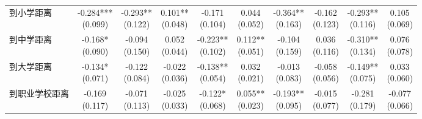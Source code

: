 \documentclass[a4paper,12pt]{report}
\begin{document}
\begin{table}[H]
{\begin{tabular}{lccccccccc}
到小学距离 & \makecell{-0.284***\\(0.099)} & \makecell{-0.293**\\(0.122)} & \makecell{0.101**\\(0.048)} & \makecell{-0.171\\(0.104)} & \makecell{0.044\\(0.052)} & \makecell{-0.364**\\(0.163)} & \makecell{-0.162\\(0.123)} & \makecell{-0.293**\\(0.116)} & \makecell{0.105\\(0.069)} \\
到中学距离 & \makecell{-0.168*\\(0.090)} & \makecell{-0.094\\(0.150)} & \makecell{0.052\\(0.044)} & \makecell{-0.223**\\(0.102)} & \makecell{0.112**\\(0.051)} & \makecell{-0.104\\(0.159)} & \makecell{0.036\\(0.116)} & \makecell{-0.310**\\(0.134)} & \makecell{0.076\\(0.078)} \\
到大学距离 & \makecell{-0.134*\\(0.071)} & \makecell{-0.122\\(0.084)} & \makecell{-0.022\\(0.036)} & \makecell{-0.138**\\(0.054)} & \makecell{0.032\\(0.021)} & \makecell{-0.013\\(0.083)} & \makecell{-0.058\\(0.056)} & \makecell{-0.149**\\(0.075)} & \makecell{0.033\\(0.060)} \\
到职业学校距离 & \makecell{-0.169\\(0.117)} & \makecell{-0.071\\(0.113)} & \makecell{-0.025\\(0.033)} & \makecell{-0.122*\\(0.068)} & \makecell{0.055**\\(0.023)} & \makecell{-0.193**\\(0.095)} & \makecell{-0.015\\(0.077)} & \makecell{-0.281\\(0.179)} & \makecell{-0.077\\(0.066)} \\

\end{tabular}}
\end{table}
\end{document}
